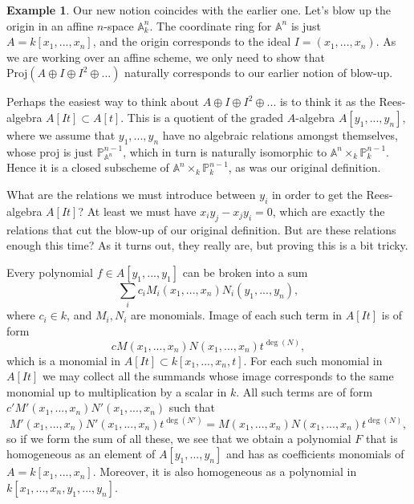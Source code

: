 \documentclass[12pt,a4paper,leqno]{article}
\newcommand{\Aff}{\mathbb{A}}
\newcommand{\Proj}{\mathbb{P}}
\newcommand{\proj}{\mathrm{Proj}}
\theoremstyle{plain}
\theoremstyle{definition}
\newtheorem{ex}[theo]{Example}
\theoremstyle{remark}
\begin{document}
\begin{ex}
Our new notion coincides with the earlier one. Let's blow up the origin in an affine $n$-space $\Aff_k^n$. The coordinate ring for $\Aff^n$ is just $A = k[x_1,...,x_n]$, and the origin corresponds to the ideal $I = (x_1,...,x_n)$. As we are working over an affine scheme, we only need to show that $\proj (A \oplus I \oplus I^2 \oplus ...)$ naturally corresponds to our earlier notion of blow-up.

Perhaps the easiest way to think about $A \oplus I \oplus I^2 \oplus ...$ is to think it as the Rees-algebra $A[It] \subset A[t]$. This is a quotient of the graded $A$-algebra $A[y_1, ... , y_n]$, where we assume that $y_1,...,y_n$ have no algebraic relations amongst themselves, whose proj is just $\Proj_{\Aff^n}^{n-1}$, which in turn is naturally isomorphic to $\Aff^n \times_k \Proj_k^{n-1}$. Hence it is a closed subscheme of $\Aff^n \times_k \Proj_k^{n-1}$, as was our original definition.

What are the relations we must introduce between $y_i$ in order to get the Rees-algebra $A[It]$? At least we must have $x_i y_j - x_j y_i = 0$, which are exactly the relations that cut the blow-up of our original definition. But are these relations enough this time? As it turns out, they really are, but proving this is a bit tricky.

Every polynomial $f \in A[y_1,...,y_1]$ can be broken into a sum
\begin{equation*}
\sum_i c_i M_i(x_1,...,x_n)N_i(y_1,...,y_n),
\end{equation*}
where $c_i \in k$, and $M_i, N_i$ are monomials. Image of each such term in $A[It]$ is of form
\begin{equation*}
c M(x_1,...,x_n)N(x_1,...,x_n)t^{\deg (N)},
\end{equation*}
which is a monomial in $A[It] \subset k[x_1,...,x_n,t]$. For each such monomial in $A[It]$ we may collect all the summands whose image corresponds to the same monomial up to multiplication by a scalar in $k$. All such terms are of form $c' M'(x_1,...,x_n)N'(x_1,...,x_n)$ such that
\begin{equation*}
M'(x_1,...,x_n)N'(x_1,...,x_n)t^{\deg (N')} = M(x_1,...,x_n)N(x_1,...,x_n)t^{\deg (N)},
\end{equation*}
so if we form the sum of all these, we see that we obtain a polynomial $F$ that is homogeneous as an element of $A[y_1,...,y_n]$ and has as coefficients monomials of $A = k[x_1,...,x_n]$. Moreover, it is also homogeneous as a polynomial in $k[x_1,...,x_n,y_1,...,y_n]$.


\end{ex}
\end{document}
